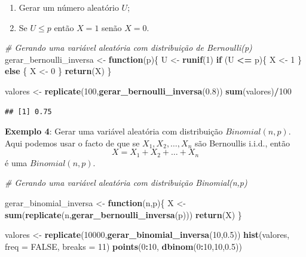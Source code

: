 \documentclass[
]{book}
\newenvironment{Shaded}{\begin{snugshade}}{\end{snugshade}}
\newcommand{\AttributeTok}[1]{\textcolor[rgb]{0.13,0.29,0.53}{#1}}
\newcommand{\CommentTok}[1]{\textcolor[rgb]{0.56,0.35,0.01}{\textit{#1}}}
\newcommand{\ConstantTok}[1]{\textcolor[rgb]{0.56,0.35,0.01}{#1}}
\newcommand{\ControlFlowTok}[1]{\textcolor[rgb]{0.13,0.29,0.53}{\textbf{#1}}}
\newcommand{\DecValTok}[1]{\textcolor[rgb]{0.00,0.00,0.81}{#1}}
\newcommand{\FloatTok}[1]{\textcolor[rgb]{0.00,0.00,0.81}{#1}}
\newcommand{\FunctionTok}[1]{\textcolor[rgb]{0.13,0.29,0.53}{\textbf{#1}}}
\newcommand{\NormalTok}[1]{#1}
\newcommand{\OtherTok}[1]{\textcolor[rgb]{0.56,0.35,0.01}{#1}}
\newcommand{\SpecialCharTok}[1]{\textcolor[rgb]{0.81,0.36,0.00}{\textbf{#1}}}
\providecommand{\tightlist}{%
  \setlength{\itemsep}{0pt}\setlength{\parskip}{0pt}}
\begin{document}
\begin{enumerate}
\def\labelenumi{\arabic{enumi}.}
\tightlist
\item
  Gerar um número aleatório \(U\);
\item
  Se \(U \leq p\) então \(X=1\) senão \(X=0\).
\end{enumerate}

\begin{Shaded}
\begin{Highlighting}[]
\CommentTok{\# Gerando uma variável aleatória com distribuição de Bernoulli(p)}
\NormalTok{gerar\_bernoulli\_inversa }\OtherTok{\textless{}{-}} \ControlFlowTok{function}\NormalTok{(p)\{}
\NormalTok{  U }\OtherTok{\textless{}{-}} \FunctionTok{runif}\NormalTok{(}\DecValTok{1}\NormalTok{)}
  \ControlFlowTok{if}\NormalTok{ (U }\SpecialCharTok{\textless{}=}\NormalTok{ p)\{}
\NormalTok{    X }\OtherTok{\textless{}{-}} \DecValTok{1}
\NormalTok{  \} }\ControlFlowTok{else}\NormalTok{ \{}
\NormalTok{    X }\OtherTok{\textless{}{-}} \DecValTok{0}
\NormalTok{  \}}
  \FunctionTok{return}\NormalTok{(X)}
\NormalTok{\}}

\NormalTok{valores }\OtherTok{\textless{}{-}} \FunctionTok{replicate}\NormalTok{(}\DecValTok{100}\NormalTok{,}\FunctionTok{gerar\_bernoulli\_inversa}\NormalTok{(}\FloatTok{0.8}\NormalTok{))}
\FunctionTok{sum}\NormalTok{(valores)}\SpecialCharTok{/}\DecValTok{100}
\end{Highlighting}
\end{Shaded}

\begin{verbatim}
## [1] 0.75
\end{verbatim}

\textbf{Exemplo 4}: Gerar uma variável aleatória com distribuição
\(Binomial(n,p)\). Aqui podemos usar o facto de que se
\(X_{1},X_{2},\ldots,X_{n}\) são Bernoullis i.i.d., então
\[X = X_{1}+X_{2}+\ldots+X_{n}\] é uma \(Binomial(n,p)\).

\begin{Shaded}
\begin{Highlighting}[]
\CommentTok{\# Gerando uma variável aleatória com distribuição Binomial(n,p)}

\NormalTok{gerar\_binomial\_inversa }\OtherTok{\textless{}{-}} \ControlFlowTok{function}\NormalTok{(n,p)\{}
\NormalTok{  X }\OtherTok{\textless{}{-}} \FunctionTok{sum}\NormalTok{(}\FunctionTok{replicate}\NormalTok{(n,}\FunctionTok{gerar\_bernoulli\_inversa}\NormalTok{(p)))}
  \FunctionTok{return}\NormalTok{(X)}
\NormalTok{\}}

\NormalTok{valores }\OtherTok{\textless{}{-}} \FunctionTok{replicate}\NormalTok{(}\DecValTok{10000}\NormalTok{,}\FunctionTok{gerar\_binomial\_inversa}\NormalTok{(}\DecValTok{10}\NormalTok{,}\FloatTok{0.5}\NormalTok{))}
\FunctionTok{hist}\NormalTok{(valores, }\AttributeTok{freq =} \ConstantTok{FALSE}\NormalTok{, }\AttributeTok{breaks =} \DecValTok{11}\NormalTok{)}
\FunctionTok{points}\NormalTok{(}\DecValTok{0}\SpecialCharTok{:}\DecValTok{10}\NormalTok{, }\FunctionTok{dbinom}\NormalTok{(}\DecValTok{0}\SpecialCharTok{:}\DecValTok{10}\NormalTok{,}\DecValTok{10}\NormalTok{,}\FloatTok{0.5}\NormalTok{))}
\end{Highlighting}
\end{Shaded}
\end{document}
